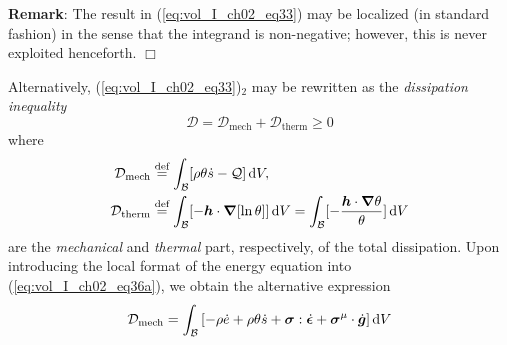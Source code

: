 \textbf{Remark}: The result in (\ref{eq:vol_I_ch02_eq33}) may be localized (in standard fashion) in the
sense that the integrand is non-negative; however, this is never exploited henceforth. $\Box$

Alternatively, (\ref{eq:vol_I_ch02_eq33})$_2$ may be rewritten as the {\em dissipation inequality}
\begin{equation}
  \mathcal{D} = \mathcal{D}_{\mathrm{mech}} +
  \mathcal{D}_{\mathrm{therm}} \geq 0
 \label{eq:vol_I_ch02_eq35}
\end{equation}
where
\begin{subequations}\label{eq:vol_I_ch02_eq36}
\begin{align}
  \mathcal{D}_{\mathrm{mech}} &\stackrel{\text{def}}{=} \int_{\mathcal{B}} [\rho\theta\dot{s} - \mathcal{Q}] \mathop{}\!\mathrm{d} V ,
\label{eq:vol_I_ch02_eq36a} \\
  \mathcal{D}_{\mathrm{therm}} &\stackrel{\text{def}}{=} \int_{\mathcal{B}} [-{\bm h} \cdot {\bm \nabla}[\ln\theta]] \mathop{}\!\mathrm{d} V
  = \int_{\mathcal{B}} [-\frac{{\bm h} \cdot {\bm \nabla}\theta}{\theta}] \mathop{}\!\mathrm{d} V
\label{eq:vol_I_ch02_eq36b}
\end{align}
\end{subequations}
are the {\em mechanical} and {\em thermal} part, respectively, of the total dissipation. Upon introducing the local
format of the energy equation into (\ref{eq:vol_I_ch02_eq36a}), we obtain the alternative expression
\begin{equation}
  \mathcal{D}_{\mathrm{mech}} = \int_{\mathcal{B}} \left[-\rho \dot{e} + \rho \theta \dot{s} +
  {\bm \sigma}: \dot{\bm \epsilon} + \bm{\sigma}^{\mathrm{\mu}} \cdot \dot{\bm g}\right] \mathop{}\!\mathrm{d} V
 \label{eq:vol_I_ch02_eq37}
\end{equation}
